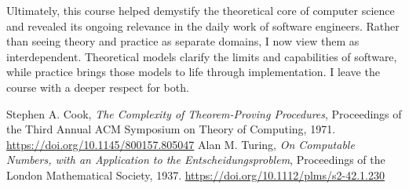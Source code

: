 \documentclass{article}
\theoremstyle{theorem}
\theoremstyle{definition}
\theoremstyle{remark}
\begin{document}
Ultimately, this course helped demystify the theoretical core of computer science and revealed its ongoing relevance in the daily work of software engineers. Rather than seeing theory and practice as separate domains, I now view them as interdependent. Theoretical models clarify the limits and capabilities of software, while practice brings those models to life through implementation. I leave the course with a deeper respect for both.

\begin{thebibliography}{99}
   Stephen A. Cook, \emph{The Complexity of Theorem-Proving Procedures}, Proceedings of the Third Annual ACM Symposium on Theory of Computing, 1971. \url{https://doi.org/10.1145/800157.805047}
   Alan M. Turing, \emph{On Computable Numbers, with an Application to the Entscheidungsproblem}, Proceedings of the London Mathematical Society, 1937. \url{https://doi.org/10.1112/plms/s2-42.1.230}
  \end{thebibliography}
\end{document}
